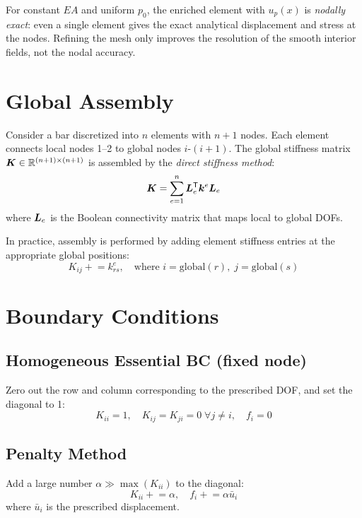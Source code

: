 \begin{remark}
For constant $EA$ and uniform $p_0$, the enriched element with $u_p(x)$ is
\emph{nodally exact}: even a single element gives the exact analytical
displacement and stress at the nodes. Refining the mesh only improves the
resolution of the smooth interior fields, not the nodal accuracy.
\end{remark}

\section{Global Assembly}

Consider a bar discretized into $n$ elements with $n+1$ nodes. Each element
connects local nodes 1--2 to global nodes $i$-$(i+1)$. The global stiffness
matrix $\bm{K} \in \mathbb{R}^{(n+1)\times(n+1)}$ is assembled by the
\emph{direct stiffness method}:
\begin{equation}
    \bm{K} = \sum_{e=1}^{n} \bm{L}_e^{\mathsf{T}} \bm{k}^e \bm{L}_e
    \label{eq:assembly}
\end{equation}
where $\bm{L}_e$ is the Boolean connectivity matrix that maps local to global DOFs.

In practice, assembly is performed by adding element stiffness entries at the
appropriate global positions:
\begin{equation}
    K_{ij} \mathrel{+}= k^e_{rs}, \quad \text{where } i = \text{global}(r),\; j = \text{global}(s)
\end{equation}

\section{Boundary Conditions}

\subsection{Homogeneous Essential BC (fixed node)}
Zero out the row and column corresponding to the prescribed DOF, and set the
diagonal to 1:
\begin{equation}
    K_{ii} = 1, \quad K_{ij} = K_{ji} = 0 \;\forall j \neq i, \quad f_i = 0
\end{equation}

\subsection{Penalty Method}
Add a large number $\alpha \gg \max(K_{ii})$ to the diagonal:
\begin{equation}
    K_{ii} \mathrel{+}= \alpha, \quad f_i \mathrel{+}= \alpha \bar{u}_i
\end{equation}
where $\bar{u}_i$ is the prescribed displacement.

